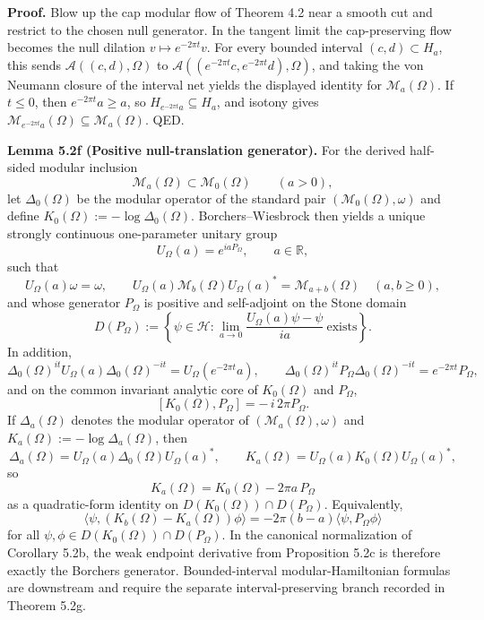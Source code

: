 \textbf{Proof.} Blow up the cap modular flow of Theorem 4.2 near a smooth cut and restrict to the chosen null generator. In the tangent limit the cap-preserving flow becomes the null dilation \(v\mapsto e^{-2\pi t}v\). For every bounded interval \((c,d)\subset H_a\), this sends \(\mathcal A((c,d),\Omega)\) to \(\mathcal A((e^{-2\pi t}c,e^{-2\pi t}d),\Omega)\), and taking the von Neumann closure of the interval net yields the displayed identity for \(\mathcal M_a(\Omega)\). If \(t\le 0\), then \(e^{-2\pi t}a\ge a\), so \(H_{e^{-2\pi t}a}\subseteq H_a\), and isotony gives \(\mathcal M_{e^{-2\pi t}a}(\Omega)\subseteq \mathcal M_a(\Omega)\). QED.

\textbf{Lemma 5.2f (Positive null-translation generator).} For the derived half-sided modular inclusion
\[
\mathcal M_a(\Omega)\subset \mathcal M_0(\Omega)
\qquad (a>0),
\]
let \(\Delta_0(\Omega)\) be the modular operator of the standard pair \((\mathcal M_0(\Omega),\omega)\) and define \(K_0(\Omega):=-\log \Delta_0(\Omega)\). Borchers--Wiesbrock then yields a unique strongly continuous one-parameter unitary group
\[
U_\Omega(a)=e^{iaP_\Omega},
\qquad a\in\mathbb R,
\]
such that
\[
U_\Omega(a)\omega=\omega,
\qquad
U_\Omega(a)\mathcal M_b(\Omega)U_\Omega(a)^*=\mathcal M_{a+b}(\Omega)
\quad (a,b\ge0),
\]
and whose generator \(P_\Omega\) is positive and self-adjoint on the Stone domain
\[
D(P_\Omega)
:=
\left\{
\psi\in\mathcal H:
\lim_{a\to0}\frac{U_\Omega(a)\psi-\psi}{ia}\ \text{exists}
\right\}.
\]
In addition,
\[
\Delta_0(\Omega)^{it}U_\Omega(a)\Delta_0(\Omega)^{-it}
=
U_\Omega(e^{-2\pi t}a),
\qquad
\Delta_0(\Omega)^{it}P_\Omega\Delta_0(\Omega)^{-it}
=
e^{-2\pi t}P_\Omega,
\]
and on the common invariant analytic core of \(K_0(\Omega)\) and \(P_\Omega\),
\[
[K_0(\Omega),P_\Omega]=-\,i\,2\pi P_\Omega.
\]
If \(\Delta_a(\Omega)\) denotes the modular operator of \((\mathcal M_a(\Omega),\omega)\) and \(K_a(\Omega):=-\log \Delta_a(\Omega)\), then
\[
\Delta_a(\Omega)=U_\Omega(a)\Delta_0(\Omega)U_\Omega(a)^*,
\qquad
K_a(\Omega)=U_\Omega(a)K_0(\Omega)U_\Omega(a)^*,
\]
so
\[
K_a(\Omega)=K_0(\Omega)-2\pi a\,P_\Omega
\]
as a quadratic-form identity on \(D(K_0(\Omega))\cap D(P_\Omega)\). Equivalently,
\[
\langle\psi,(K_b(\Omega)-K_a(\Omega))\phi\rangle
=
-2\pi(b-a)\langle\psi,P_\Omega\phi\rangle
\]
for all \(\psi,\phi\in D(K_0(\Omega))\cap D(P_\Omega)\). In the canonical normalization of Corollary 5.2b, the weak endpoint derivative from Proposition 5.2c is therefore exactly the Borchers generator. Bounded-interval modular-Hamiltonian formulas are downstream and require the separate interval-preserving branch recorded in Theorem 5.2g.

